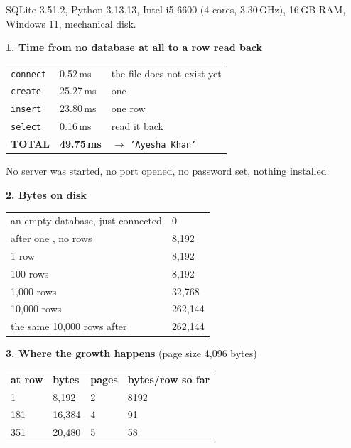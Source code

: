 \begin{measured}
\textsf{\footnotesize SQLite 3.51.2, Python 3.13.13, Intel i5-6600 (4 cores,
3.30\,GHz), 16\,GB RAM, Windows 11, mechanical disk.}

\medskip
\textbf{1. Time from no database at all to a row read back}

\begin{tabular}{@{}L{4.6cm}R{2.4cm}L{6.5cm}@{}}
\texttt{connect}  & 0.52\,ms  & the file does not exist yet \\
\texttt{create}   & 25.27\,ms & one  \\
\texttt{insert}   & 23.80\,ms & one row \\
\texttt{select}   & 0.16\,ms  & read it back \\
\textbf{TOTAL}    & \textbf{49.75\,ms} & $\rightarrow$ \texttt{'Ayesha Khan'} \\
\end{tabular}

\smallskip
No server was started, no port opened, no password set, nothing installed.

\medskip
\textbf{2. Bytes on disk}

\begin{tabular}{@{}L{8.2cm}R{2.6cm}@{}}
an empty database, just connected & 0 \\
after one , no rows & 8{,}192 \\
1 row & 8{,}192 \\
100 rows & 8{,}192 \\
1{,}000 rows & 32{,}768 \\
10{,}000 rows & 262{,}144 \\
the same 10{,}000 rows after  & 262{,}144 \\
\end{tabular}

\medskip
\textbf{3. Where the growth happens} (page size 4{,}096 bytes)

\begin{tabular}{@{}R{2.0cm}R{2.4cm}R{1.8cm}R{3.4cm}@{}}
\textbf{at row} & \textbf{bytes} & \textbf{pages} & \textbf{bytes/row so far} \\
1   & 8{,}192  & 2 & 8192 \\
181 & 16{,}384 & 4 & 91 \\
351 & 20{,}480 & 5 & 58 \\
\end{tabular}


\end{measured}
